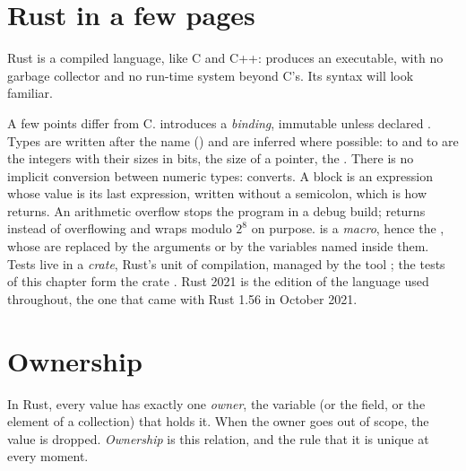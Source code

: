 \section{Rust in a few pages}\label{sec:b2:rust-ownership:basics}

Rust is a compiled language, like C and C++:  produces an executable, with no garbage collector
and no run-time system beyond C's. Its syntax will look familiar.

\label{lst:b2:rust-ownership:hello}

\label{out:b2:rust-ownership:hello}

A few points differ from C.  introduces a \emph{binding}, immutable unless declared . Types are
written after the name () and are inferred where possible:  to  and  to
 are the integers with their sizes in bits,  the size of a pointer,  the
. There is no implicit conversion between numeric types:  converts. A block is an expression
whose value is its last expression, written without a semicolon, which is how  returns. An
arithmetic overflow stops the program in a debug build;  returns  instead of
overflowing and  wraps modulo $2^8$ on purpose.  is a \emph{macro}, hence the
\code{!}, whose \code{{}} are replaced by the arguments or by the variables named inside them. Tests live in a
\emph{crate}, Rust's unit of compilation, managed by the tool ; the tests of this chapter form the crate
. Rust 2021 is the edition of the language used throughout, the one that came with Rust
1.56 in October 2021.

\section{Ownership}\label{sec:b2:rust-ownership:ownership}

\begin{definition}\label{def:b2:rust-ownership:ownership}
In Rust, every value has exactly one \emph{owner}, the variable (or the field, or the element of
a collection) that holds it. When the owner goes out of scope, the value is dropped. \emph{Ownership}
is this relation, and the rule that it is unique at every moment.
\end{definition}

